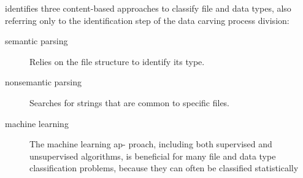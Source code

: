 \cite{beebe_sceadan:_2013} identifies three content-based approaches to classify file and data types, also referring only to the identification step of the \cite{ali_review_2018} data carving process division:
\begin{description}
    \item [semantic parsing] Relies on the file structure to identify its type.
    \item[nonsemantic parsing] Searches for strings that are common to specific files.
    \item [machine learning] 
    The machine learning ap-
proach, including both supervised and unsupervised algorithms,
is beneficial for many file and data type classification problems,
because they can often be classified statistically
\end{description}


